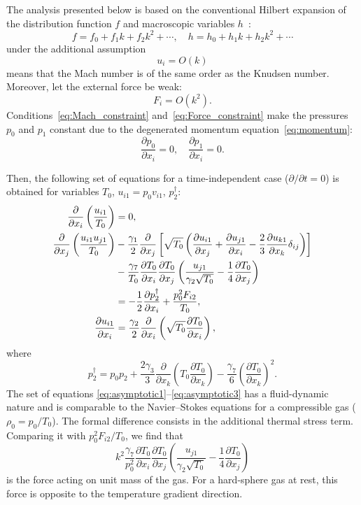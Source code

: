 \documentclass[smallextended, referee]{svjour3} %
\newcommand{\pder}[2][]{\frac{\partial#1}{\partial#2}}
\newcommand{\Pder}[2][]{\partial#1/\partial#2}
\begin{document}
The analysis presented below is based on the conventional Hilbert expansion
of the distribution function \(f\) and macroscopic variables \(h\)~\cite{Hilbert1912}:
\[ f = f_0 + f_1k + f_2k^2 + \cdots, \quad h = h_0 + h_1k + h_2k^2 + \cdots \]
under the additional assumption
\begin{equation}\label{eq:Mach_constraint}
    u_i = O(k)
\end{equation}
means that the Mach number is of the same order as the Knudsen number.
Moreover, let the external force be weak:
\begin{equation}\label{eq:Force_constraint}
    F_i = O(k^2).
\end{equation}
Conditions~\eqref{eq:Mach_constraint} and~\eqref{eq:Force_constraint} make the pressures
\(p_0\) and \(p_1\) constant due to the degenerated momentum equation~\eqref{eq:momentum}:
\begin{equation}
    \pder[p_0]{x_i} = 0, \quad \pder[p_1]{x_i} = 0.
\end{equation}

Then, the following set of equations for a time-independent case (\(\Pder{t} = 0\))
is obtained for variables \(T_0\), \(u_{i1} = p_0v_{i1}\), \(p_2^\dag\):
\begin{align}
    \pder{x_i}\left(\frac{u_{i1}}{T_0}\right) &= 0, \label{eq:asymptotic1} \\
    \pder{x_j}\left(\frac{u_{i1}u_{j1}}{T_0}\right)
        &-\frac{\gamma_1}2\pder{x_j}\left[\sqrt{T_0}\left(
            \pder[u_{i1}]{x_j} + \pder[u_{j1}]{x_i} - \frac23\pder[u_{k1}]{x_k}\delta_{ij}
        \right)\right] \notag\\
        &- \frac{\gamma_7}{T_0}\pder[T_0]{x_i}\pder[T_0]{x_j}\left(\frac{u_{j1}}{\gamma_2\sqrt{T_0}} - \frac{1}4\pder[T_0]{x_j}\right) \notag\\
        &= -\frac12\pder[p_2^\dag]{x_i} + \frac{p_0^2 F_{i2}}{T_0}, \label{eq:asymptotic2} \\
    \pder[u_{i1}]{x_i} &= \frac{\gamma_2}2\pder{x_i}\left(\sqrt{T_0}\pder[T_0]{x_i}\right), \label{eq:asymptotic3}
\end{align}
where
\begin{equation}\label{eq:dag_pressure}
    p_2^\dag = p_0 p_2
        + \frac{2\gamma_3}{3}\pder{x_k}\left(T_0\pder[T_0]{x_k}\right)
        - \frac{\gamma_7}{6}\left(\pder[T_0]{x_k}\right)^2.
\end{equation}
The set of equations \eqref{eq:asymptotic1}--\eqref{eq:asymptotic3} has a fluid-dynamic nature
and is comparable to the Navier--Stokes equations for a compressible gas (\(\rho_0 = p_0/T_0\)).
The formal difference consists in the additional thermal stress term.
Comparing it with \(p_0^2F_{i2}/T_0\), we find that
\begin{equation}\label{eq:force}
    k^2\frac{\gamma_7}{p_0^2}\pder[T_0]{x_i}\pder[T_0]{x_j}\left(\frac{u_{j1}}{\gamma_2\sqrt{T_0}} - \frac{1}4\pder[T_0]{x_j}\right)
\end{equation}
is the force acting on unit mass of the gas.
For a hard-sphere gas at rest, this force is opposite to the temperature gradient direction.
\end{document}
